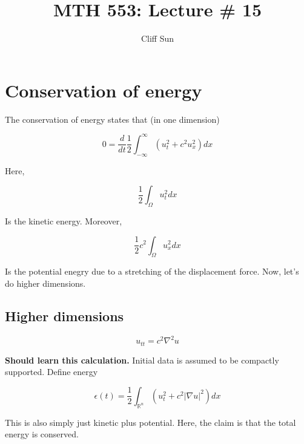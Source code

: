 \documentclass{article}
\title{MTH 553: Lecture \# 15}
\author{Cliff Sun}
\newtheorem{one minute paper}[theorem]{One Minute Paper}
\begin{document}
\maketitle

\section*{Conservation of energy}

The conservation of energy states that (in one dimension)

\begin{equation}
    0 = \frac{d}{dt}\frac{1}{2}\int_{-\infty}^{\infty}(u_t^2 + c^2 u_x^2)dx
\end{equation}

Here, 

\begin{equation}
    \frac{1}{2}\int_{\Omega}u_t^2 dx 
\end{equation}

Is the kinetic energy. Moreover, 

\begin{equation}
    \frac{1}{2}c^2 \int_{\Omega}u_x^2 dx 
\end{equation}

Is the potential enegry due to a stretching of the displacement force. Now, let's do higher dimensions.

\subsection*{Higher dimensions}

\begin{equation}
    u_{tt} = c^2 \nabla^2 u
\end{equation}

\textbf{Should learn this calculation.} Initial data is assumed to be compactly supported. Define energy 

\begin{equation}
    \epsilon(t) =  \frac{1}{2}\int_{\mathbb{R}^n}\left( u_t^2 + c^2|\nabla u |^2 \right)dx
\end{equation}

This is also simply just kinetic plus potential. Here, the claim is that the total energy is conserved. 
\end{document}

